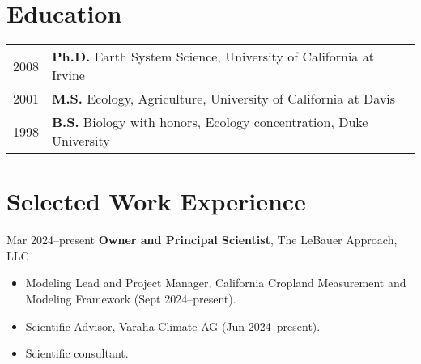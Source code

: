\documentclass[a4paper,10pt]{article}
\begin{document}

\section{Education}
\begin{tabular}{rp{13cm}}	
2008 & \textbf{Ph.D.} Earth System Science, University of California at Irvine\\
 2001 & \textbf{M.S.} Ecology, Agriculture, University of California at Davis \\
1998 & \textbf{B.S.} Biology with honors, Ecology concentration, Duke University \\
\end{tabular}
\section{Selected Work Experience}

\vspace{1em}

Mar 2024--present \textbf{Owner and Principal Scientist}, The LeBauer Approach, LLC

\begin{itemize}
    \item Modeling Lead and Project Manager, California Cropland Measurement and Modeling Framework (Sept 2024–present).
    \item Scientific Advisor, Varaha Climate AG (Jun 2024–present).
    \item Scientific consultant.
\end{itemize}
\end{document}
